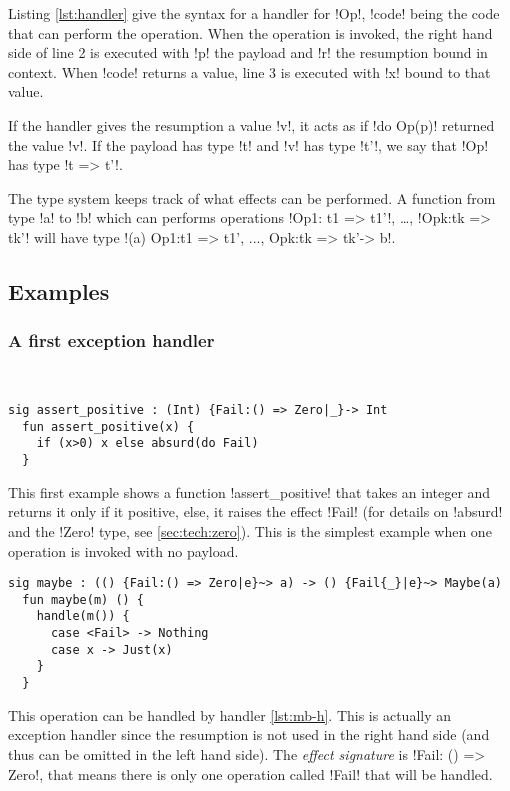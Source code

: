\documentclass[11pt, nonacm=true, language=french, language=english]{acmart}
\begin{document}
Listing \ref{lst:handler} give the syntax for a handler for !Op!, !code! being the code that can perform the operation. When the operation is invoked, the right hand side of line 2 is executed with !p! the payload and !r! the resumption bound in context. When !code! returns a value, line 3 is executed with !x! bound to that value.

If the handler gives the resumption a value !v!, it acts as if !do Op(p)! returned the value !v!. If the payload has type !t! and !v! has type !t'!, we say that !Op! has type !t => t'!.

The type system keeps track of what effects can be performed. A function from type !a! to !b! which can performs operations !Op1: t1 => t1'!, \dots, !Opk:tk => tk'! will have type !(a) {Op1:t1 => t1', ..., Opk:tk => tk'}-> b!.


\subsection{Examples}

\subsubsection{A first exception handler}
\label{sec:first-except-handl}

~

\begin{lstlisting}[caption=Fail invocation]
  sig assert_positive : (Int) {Fail:() => Zero|_}-> Int
  fun assert_positive(x) {
    if (x>0) x else absurd(do Fail)
  }
\end{lstlisting}

This first example shows a function !assert_positive! that takes an integer and returns it only if it positive, else, it raises the effect !Fail! (for details on !absurd! and the !Zero! type, see \ref{sec:tech:zero}). This is the simplest example when one operation is invoked with no payload.

\begin{lstlisting}[caption=maybe handler, label=lst:mb-h]
  sig maybe : (() {Fail:() => Zero|e}~> a) -> () {Fail{_}|e}~> Maybe(a)
  fun maybe(m) () {
    handle(m()) {
      case <Fail> -> Nothing
      case x -> Just(x)
    }
  }
\end{lstlisting}

This operation can be handled by handler \ref{lst:mb-h}. This is actually an exception handler since the resumption is not used in the right hand side (and thus can be omitted in the left hand side). The \emph{effect signature} is !{Fail: () => Zero}!, that means there is only one operation called !Fail! that will be handled.
\end{document}
